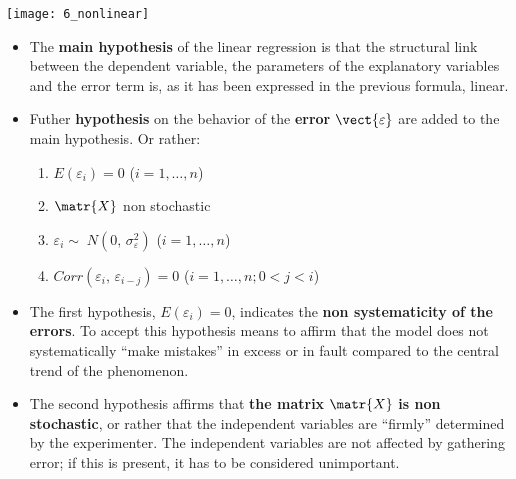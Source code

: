 \begin{frame}
  \begin{center}
    \texttt{[image: 6\_nonlinear]}
  \end{center}
\end{frame}





\begin{frame}
  \vspace*{.25cm}
  \begin{itemize}
    \item The \textbf{main hypothesis} of the linear regression is that the structural link between the dependent variable, the parameters of the explanatory variables and the error term is, as it has been expressed in the previous formula, linear. 
    \vspace*{.5cm}
    \item Futher \textbf{hypothesis} on the behavior of the \textbf{error} $ \vect{\varepsilon} $ are added to the main hypothesis. Or rather:\\
    \begin{enumerate}
     \item $ E(\varepsilon_{i}) = 0 $ \hspace{1.7cm} ($ i = 1, \dots, n $)
     \item $ \matr{X} $ non stochastic
     \item $ \varepsilon_i \sim\; N(0,\,\sigma^2_\varepsilon) $ \hspace{1cm} ($ i = 1, \dots, n $)
     \item $ Corr(\varepsilon_{i},\,\varepsilon_{i-j}) = 0 $ \hspace{0.4cm} ($ i = 1, \dots, n; 0 < j < i $)
    \end{enumerate}
  \end{itemize}
\end{frame}

\begin{frame}
  \vspace*{.5cm}
  \begin{itemize}
    \item The first hypothesis, {\boldmath$E(\varepsilon_{i})=0$}, indicates the \textbf{non systematicity of the errors}. To accept this hypothesis means to affirm that the model does not systematically ``make mistakes'' in excess or in fault compared to the central trend of the phenomenon.
    \vspace*{.5cm}
    \item The second hypothesis affirms that \textbf{the matrix} $ \matr{X} $ \textbf{is non stochastic}, or rather that the independent variables are ``firmly'' determined by the experimenter. The independent variables are not affected by gathering error; if this is present, it has to be considered unimportant. 
  \end{itemize}
\end{frame}


